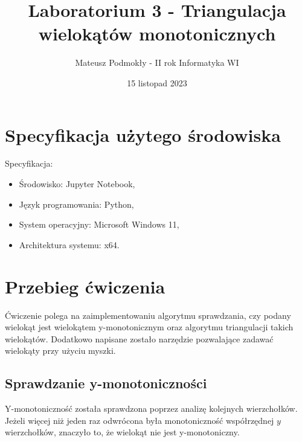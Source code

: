 \documentclass[11pt]{scrartcl}
\title{Laboratorium 3 - Triangulacja wielokątów monotonicznych}
\author{Mateusz Podmokły - II rok Informatyka WI}
\date{15 listopad 2023}
\begin{document}
    \maketitle
    \section{Specyfikacja użytego środowiska}
    Specyfikacja:

    \begin{itemize}
        \item Środowisko: Jupyter Notebook,
        \item Język programowania: Python,
        \item System operacyjny: Microsoft Windows 11,
        \item Architektura systemu: x64.
    \end{itemize}

    \section{Przebieg ćwiczenia}
    Ćwiczenie polega na zaimplementowaniu algorytmu sprawdzania, czy podany wielokąt
    jest wielokątem y-monotonicznym oraz algorytmu triangulacji takich wielokątów.
    Dodatkowo napisane zostało narzędzie pozwalające zadawać wielokąty przy użyciu
    myszki.

    \subsection{Sprawdzanie y-monotoniczności}
    Y-monotoniczność została sprawdzona poprzez analizę kolejnych wierzchołków. Jeżeli
    więcej niż jeden raz odwrócona była monotoniczność współrzędnej $y$ wierzchołków,
    znaczyło to, że wielokąt nie jest y-monotoniczny.
\end{document}
